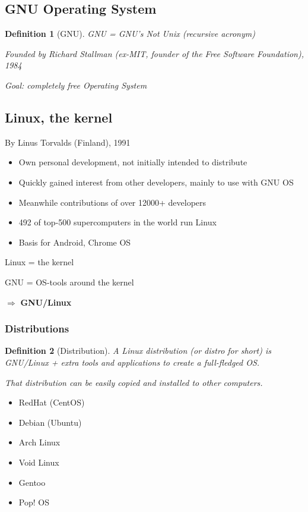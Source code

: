 \documentclass{article}
\newtheorem{theorem}{Definition}[section]
\begin{document}
\subsection{GNU Operating System}

\begin{theorem}[GNU]
GNU = GNU's Not Unix (recursive acronym)

Founded by Richard Stallman (ex-MIT, founder of the Free Software Foundation), 1984

Goal: completely free Operating System
\end{theorem}

\subsection{Linux, the kernel}

By Linus Torvalds (Finland), 1991

\begin{itemize}
    \item Own personal development, not initially intended to distribute
    \item Quickly gained interest from other developers, mainly to use with GNU OS
    \item Meanwhile contributions of over 12000+ developers
    \item 492 of top-500 supercomputers in the world run Linux
    \item Basis for Android, Chrome OS
\end{itemize}

Linux = the kernel

GNU = OS-tools around the kernel

$\Rightarrow$ \textbf{GNU/Linux}

\subsubsection{Distributions}

\begin{theorem}[Distribution]
A Linux distribution (or distro for short) is GNU/Linux + extra tools and applications to create a full-fledged OS.

That distribution can be easily copied and installed to other computers.
\end{theorem}

\begin{itemize}
    \item RedHat (CentOS)
    \item Debian (Ubuntu)
    \item Arch Linux
    \item Void Linux
    \item Gentoo
    \item Pop! OS
\end{itemize}
\end{document}
